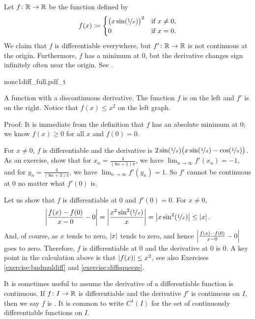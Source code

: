 \begin{example} \label{baddifffunc:example}
Let $f \colon {\mathbb{R}} \to {\mathbb{R}}$ be the function defined by
\begin{equation*}
f(x) \coloneqq
\begin{cases}
{\bigl( x \sin(\nicefrac{1}{x}) \bigr)}^2 & \text{if } x \not= 0, \\
0 & \text{if } x = 0.
\end{cases}
\end{equation*}
We claim that $f$ is differentiable everywhere, but
$f' \colon {\mathbb{R}} \to {\mathbb{R}}$ is not continuous at
the origin.  Furthermore, $f$ has a minimum at $0$, but the derivative
changes sign infinitely often near the origin.
See .
\begin{myfigureht}
{nonc1diff_full.pdf_t}
\caption{A function with a discontinuous derivative. The function $f$ is on the left
and $f'$ is on the right.  Notice that $f(x) \leq x^2$ on the left graph.\label{fig:nonc1diff}}
\end{myfigureht}

Proof: It is immediate from the definition that $f$ has an absolute
minimum at $0$; we know $f(x) \geq 0$ for all $x$ and $f(0) = 0$.

For $x \not= 0$,
$f$ is differentiable
and
the derivative 
is $2 \sin (\nicefrac{1}{x}) \bigl( x \sin (\nicefrac{1}{x}) -
\cos(\nicefrac{1}{x}) \bigr)$.
As an exercise, show that for $x_n = \frac{4}{(8n+1)\pi}$,
we have
$\lim_{n\to\infty} f'(x_n) = -1$, and for
$y_n = \frac{4}{(8n+3)\pi}$, we have
$\lim_{n\to\infty} f'(y_n) = 1$.  So $f'$
cannot be continuous at $0$
no matter what $f'(0)$ is.

Let us show that $f$ is differentiable at $0$ and $f'(0)=0$.
For $x \not= 0$,
\begin{equation*}
\left\lvert {\frac{f(x)-f(0)}{x-0} - 0} \right\rvert
=
\left\lvert {\frac{x^2 \sin^2(\nicefrac{1}{x})}{x}} \right\rvert
=
\left\lvert {x \sin^2(\nicefrac{1}{x})} \right\rvert
\leq
\left\lvert {x} \right\rvert .
\end{equation*}
And, of course, as $x$ tends to zero, $\left\lvert {x} \right\rvert$ tends to zero, and hence
$\left\lvert {\frac{f(x)-f(0)}{x-0} - 0} \right\rvert$ goes to zero.  Therefore, $f$
is differentiable at 0 and the derivative at 0 is 0.
A key point in the calculation above
is that $\left\lvert {f(x)} \right\rvert \leq x^2$,
see also Exercises \ref{exercise:bndmuldiff} and
\ref{exercise:diffsqueeze}.
\end{example}

It is sometimes useful to assume the derivative of a differentiable
function is continuous.  If $f \colon I \to {\mathbb{R}}$ is differentiable and
the derivative $f'$ is continuous on $I$, then we say $f$ is
\emph{}.  It is common to
write $C^1(I)$ for the set of continuously differentiable functions on $I$.

